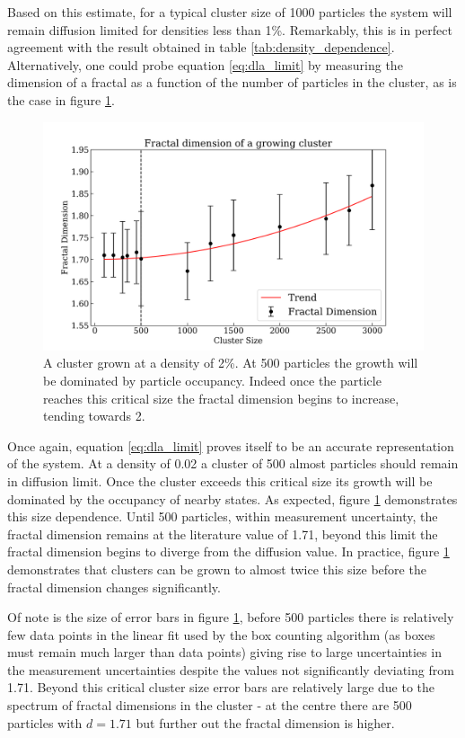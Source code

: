 \documentclass[%
 aapm,
 mph,%
 amsmath,amssymb,
 reprint,%
]{revtex4-2}
\begin{document}
Based on this estimate, for a typical cluster size of 1000 particles the system will remain diffusion limited for densities less than 1\%. Remarkably, this is in perfect agreement with the result obtained in table \ref{tab:density_dependence}. Alternatively, one could probe equation \ref{eq:dla_limit} by measuring the dimension of a fractal as a function of the number of particles in the cluster, as is the case in figure \ref{fig:cluster_growth}.
\begin{figure}[h]
\centering
\includegraphics[width=\linewidth]{figures/5.png}
\caption{\label{fig:cluster_growth}A cluster grown at a density of 2\%. At 500 particles the growth will be dominated by particle occupancy. Indeed once the particle reaches this critical size the fractal dimension begins to increase, tending towards 2.}
\end{figure}
Once again, equation \ref{eq:dla_limit} proves itself to be an accurate representation of the system. At a density of 0.02 a cluster of 500 almost particles should remain in diffusion limit. Once the cluster exceeds this critical size its growth will be dominated by the occupancy of nearby states. As expected, figure \ref{fig:cluster_growth} demonstrates this size dependence. Until 500 particles, within measurement uncertainty, the  fractal dimension remains at the literature value of 1.71, beyond this limit the fractal dimension begins to diverge from the diffusion value. In practice, figure \ref{fig:cluster_growth} demonstrates that clusters can be grown to almost twice this size before the fractal dimension changes significantly.

Of note is the size of error bars in figure \ref{fig:cluster_growth}, before 500 particles there is relatively few data points in the linear fit used by the box counting algorithm (as boxes must remain much larger than data points) giving rise to large uncertainties in the measurement uncertainties despite the values not significantly deviating from 1.71. Beyond this critical cluster size error bars are relatively large due to the spectrum of fractal dimensions in the cluster - at the centre there are 500 particles with $d=1.71$ but further out the fractal dimension is higher.
\end{document}
